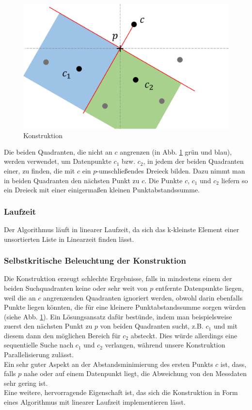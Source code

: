 \documentclass[a4paper]{extarticle}
\begin{document}
    \begin{figure}[!ht]
        \centering	
        \includegraphics[scale=0.15]{bilder/tri_konstr.pdf}
        \caption{Konstruktion}
        \label{fig:konstuktion}
    \end{figure}

    Die beiden Quadranten, die nicht an $c$ angrenzen (in Abb. \ref{fig:konstuktion} grün und blau),
    werden verwendet, um Datenpunkte $c_1$ bzw. $c_2$, in jedem der beiden Quadranten einer, zu 
    finden, die mit $c$ ein $p$-umschließendes Dreieck bilden. Dazu nimmt man in beiden Quadranten 
    den nächsten Punkt zu $c$. Die Punkte $c$, $c_1$ und $c_2$ liefern so ein Dreieck mit einer
    einigermaßen kleinen Punktabstandssumme.

    \subsubsection{Laufzeit}
    Der Algorithmus läuft in linearer Laufzeit, da sich das k-kleinste Element einer unsortierten
    Liste in Linearzeit finden lässt. %

    \subsubsection{Selbstkritische Beleuchtung der Konstruktion}
    Die Konstruktion erzeugt schlechte Ergebnisse, falls in mindestens einem der beiden 
    Suchquadranten keine oder sehr weit von $p$ entfernte Datenpunkte liegen, weil die an $c$ 
    angrenzenden Quadranten ignoriert werden, obwohl darin ebenfalls Punkte liegen könnten, die 
    für eine kleinere Punktabstandssumme sorgen würden (siehe Abb. \ref{fig:konstuktion}).
    Ein Lösungsansatz dafür bestünde, indem man beispielsweise zuerst den nächsten Punkt zu $p$ 
    von beiden Quadranten sucht, z.B. $c_1$ und mit diesem dann den möglichen Bereich für $c_2$ 
    absteckt. Dies würde allerdings eine sequentielle Suche nach $c_1$ und $c_2$ verlangen, 
    während unsere Konstruktion Parallelisierung zulässt. \\
    Ein sehr guter Aspekt an der Abstandsminimierung des ersten Punkts $c$ ist, dass, falls $p$ nahe 
    oder auf einem Datenpunkt liegt, die Abweichung von den Messdaten sehr gering ist. \\
    Eine weitere, hervorragende Eigenschaft ist, das sich die Konstruktion in Form eines Algorithmus 
    mit linearer Laufzeit implementieren lässt.
    
\end{document}
